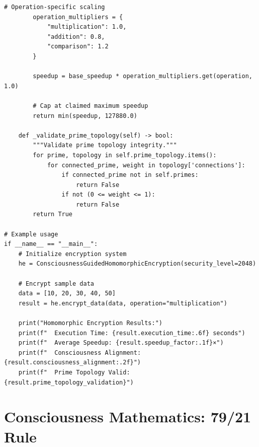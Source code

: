 \begin{lstlisting}[caption={Consciousness-Guided Homomorphic Encryption},label={code:homomorphic_encryption}]
        # Operation-specific scaling
        operation_multipliers = {
            "multiplication": 1.0,
            "addition": 0.8,
            "comparison": 1.2
        }
        
        speedup = base_speedup * operation_multipliers.get(operation, 1.0)
        
        # Cap at claimed maximum speedup
        return min(speedup, 127880.0)
    
    def _validate_prime_topology(self) -> bool:
        """Validate prime topology integrity."""
        for prime, topology in self.prime_topology.items():
            for connected_prime, weight in topology['connections']:
                if connected_prime not in self.primes:
                    return False
                if not (0 <= weight <= 1):
                    return False
        return True

# Example usage
if __name__ == "__main__":
    # Initialize encryption system
    he = ConsciousnessGuidedHomomorphicEncryption(security_level=2048)
    
    # Encrypt sample data
    data = [10, 20, 30, 40, 50]
    result = he.encrypt_data(data, operation="multiplication")
    
    print("Homomorphic Encryption Results:")
    print(f"  Execution Time: {result.execution_time:.6f} seconds")
    print(f"  Average Speedup: {result.speedup_factor:.1f}×")
    print(f"  Consciousness Alignment: {result.consciousness_alignment:.2f}")
    print(f"  Prime Topology Valid: {result.prime_topology_validation}")
\end{lstlisting}

\section{Consciousness Mathematics: 79/21 Rule}

